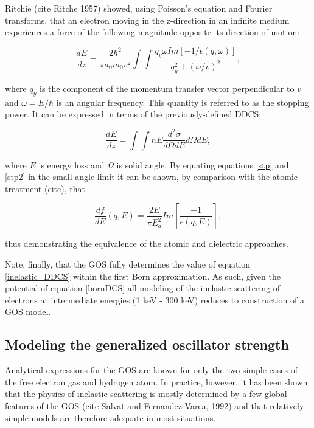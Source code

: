 \documentclass [11pt, proquest, article] {uwthesis}[2016/11/22]
\begin{document}
Ritchie (cite Ritche 1957) showed, using Poisson's equation and Fourier transforms, that an electron moving in the z-direction in an infinite medium experiences a force of the following magnitude opposite its direction of motion: 


\begin{equation} \label{stp}
\frac{dE}{dz} = \frac{2\hbar^2}{\pi a_0 m_0 v^2} \int \int \frac{q_y \omega Im[-1/\epsilon(q, \omega)]}{q_y^2 + (\omega/v)^2},
\end{equation}

where $q_y$ is the component of the momentum transfer vector perpendicular to $v$ and $\omega = E/\hbar$ is an angular frequency. This quantity is referred to as the stopping power. It can be expressed in terms of the previously-defined DDCS:

\begin{equation} \label{stp2}
\frac{dE}{dz} = \int \int n E \frac{d^2\sigma}{d\Omega dE} d\Omega dE,
\end{equation}


where $E$ is energy loss and $\Omega$ is solid angle. By equating equations \ref{stp} and \ref{stp2} in the small-angle limit it can be shown, by comparison with the atomic treatment (cite), that 

$$
\frac{df}{dE}(q, E) = \frac{2E}{\pi E_a^2} Im[\frac{-1}{\epsilon(q, E)}],
$$

thus demonstrating the equivalence of the atomic and dielectric approaches.

Note, finally, that the GOS fully determines the value of equation \ref{inelastic_DDCS} within the first Born approximation. As such, given the potential of equation \ref{bornDCS} all modeling of the inelastic scattering of electrons at intermediate energies (1 keV - 300 keV) reduces to construction of a GOS model. 




\subsection{Modeling the generalized oscillator strength}
Analytical expressions for the GOS are known for only the two simple cases of the free electron gas and hydrogen atom. In practice, however, it has been shown that the physics of inelastic scattering is mostly determined by a few global features of the GOS (cite Salvat and Fernandez-Varea, 1992) and that relatively simple models are therefore adequate in most situations.
\end{document}
